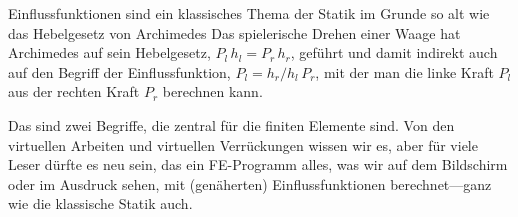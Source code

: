 {Einflussfunktionen sind ein klassisches Thema der Statik im Grunde so alt wie das Hebelgesetz von Archimedes
Das spielerische Drehen einer Waage hat Archimedes auf sein Hebelgesetz, $ P_l \, h_l = P_r \, h_r$, gef\"{u}hrt und damit indirekt auch auf den Begriff der Einflussfunktion, $P_l = h_r/h_l \, P_r$, mit der man die linke Kraft $P_l$ aus der rechten Kraft $P_r$ berechnen kann.

Das sind zwei Begriffe, die zentral f\"{u}r die finiten Elemente sind. Von den virtuellen Arbeiten und virtuellen Verr\"{u}ckungen wissen wir es, aber f\"{u}r viele Leser d\"{u}rfte es neu sein, das ein FE-Programm alles, was wir auf dem Bildschirm oder im Ausdruck sehen, mit (gen\"{a}herten) Einflussfunktionen berechnet---ganz wie die klassische Statik auch.





}
